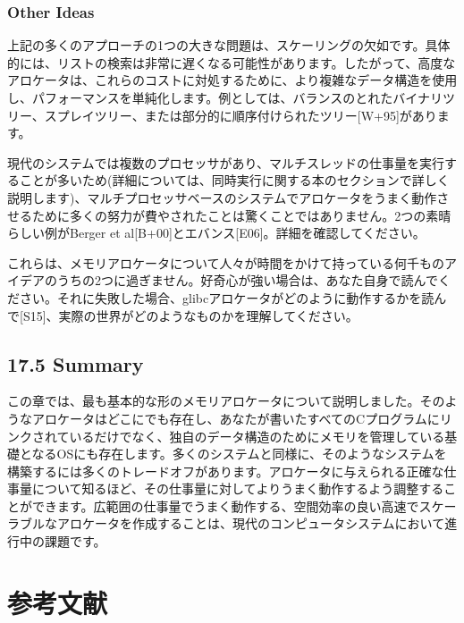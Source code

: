 \hypertarget{other-ideas}{%
\subsubsection*{Other Ideas}\label{other-ideas}}

上記の多くのアプローチの1つの大きな問題は、スケーリングの欠如です。具体的には、リストの検索は非常に遅くなる可能性があります。したがって、高度なアロケータは、これらのコストに対処するために、より複雑なデータ構造を使用し、パフォーマンスを単純化します。例としては、バランスのとれたバイナリツリー、スプレイツリー、または部分的に順序付けられたツリー{[}W+95{]}があります。

現代のシステムでは複数のプロセッサがあり、マルチスレッドの仕事量を実行することが多いため(詳細については、同時実行に関する本のセクションで詳しく説明します)、マルチプロセッサベースのシステムでアロケータをうまく動作させるために多くの努力が費やされたことは驚くことではありません。2つの素晴らしい例がBerger
et al{[}B+00{]}とエバンス{[}E06{]}。詳細を確認してください。

これらは、メモリアロケータについて人々が時間をかけて持っている何千ものアイデアのうちの2つに過ぎません。好奇心が強い場合は、あなた自身で読んでください。それに失敗した場合、glibcアロケータがどのように動作するかを読んで{[}S15{]}、実際の世界がどのようなものかを理解してください。

\hypertarget{summary-10}{%
\subsection*{17.5 Summary}\label{summary-10}}

この章では、最も基本的な形のメモリアロケータについて説明しました。そのようなアロケータはどこにでも存在し、あなたが書いたすべてのCプログラムにリンクされているだけでなく、独自のデータ構造のためにメモリを管理している基礎となるOSにも存在します。多くのシステムと同様に、そのようなシステムを構築するには多くのトレードオフがあります。アロケータに与えられる正確な仕事量について知るほど、その仕事量に対してよりうまく動作するよう調整することができます。広範囲の仕事量でうまく動作する、空間効率の良い高速でスケーラブルなアロケータを作成することは、現代のコンピュータシステムにおいて進行中の課題です。

\hypertarget{ux53c2ux8003ux6587ux732e-9}{%
\section*{参考文献}\label{ux53c2ux8003ux6587ux732e-9}}

